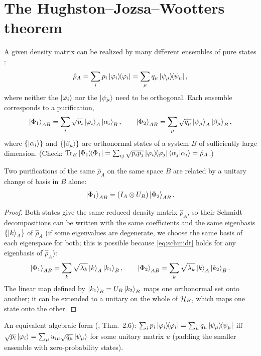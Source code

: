 \section{The Hughston--Jozsa--Wootters theorem}\label{app:hjw}
A given density matrix can be realized by many different ensembles of pure states \cite{HJW1993}:
\begin{equation}
  \hat\rho_A=\sum_ip_i\left|\varphi_i\middle\rangle\!\middle\langle\varphi_i\right|=\sum_\mu q_\mu\left|\psi_\mu\middle\rangle\!\middle\langle\psi_\mu\right|,
\end{equation}
where neither the $\left|\varphi_i\right\rangle$ nor the $\left|\psi_\mu\right\rangle$ need to be orthogonal. Each ensemble corresponds to a purification,
\begin{equation}
  \left|\Phi_1\right\rangle_{AB}=\sum_i\sqrt{p_i}\left|\varphi_i\right\rangle_A\left|\alpha_i\right\rangle_B,\qquad\left|\Phi_2\right\rangle_{AB}=\sum_\mu\sqrt{q_\mu}\left|\psi_\mu\right\rangle_A\left|\beta_\mu\right\rangle_B,
\end{equation}
where $\{\left|\alpha_i\right\rangle\}$ and $\{\left|\beta_\mu\right\rangle\}$ are orthonormal states of a system $B$ of sufficiently large dimension. (Check: $\operatorname{Tr}_B\left|\Phi_1\middle\rangle\!\middle\langle\Phi_1\right|=\sum_{ij}\sqrt{p_ip_j}\left|\varphi_i\middle\rangle\!\middle\langle\varphi_j\right|\left\langle\alpha_j\middle|\alpha_i\right\rangle=\hat\rho_A$.)
\begin{theorem}[HJW]
Two purifications of the same $\hat\rho_A$ on the same space $B$ are related by a unitary change of basis in $B$ alone:
\begin{equation}
  \left|\Phi_1\right\rangle_{AB}=(I_A\otimes U_B)\left|\Phi_2\right\rangle_{AB}.
\end{equation}
\end{theorem}
\begin{proof}
Both states give the same reduced density matrix $\hat\rho_A$, so their Schmidt decompositions can be written with the same coefficients and the same eigenbasis $\{\left|k\right\rangle_A\}$ of $\hat\rho_A$ (if some eigenvalues are degenerate, we choose the same basis
of each eigenspace for both; this is possible because \cref{eq:schmidt} holds for any eigenbasis of $\hat\rho_A$):
\begin{equation}
  \left|\Phi_1\right\rangle_{AB}=\sum_k\sqrt{\lambda_k}\left|k\right\rangle_A\left|k_1\right\rangle_B,\qquad\left|\Phi_2\right\rangle_{AB}=\sum_k\sqrt{\lambda_k}\left|k\right\rangle_A\left|k_2\right\rangle_B .
\end{equation}
The linear map defined by $\left|k_1\right\rangle_B=U_B\left|k_2\right\rangle_B$ maps one orthonormal set onto another; it can be extended to a unitary on the whole of $\mathcal H_B$, which maps one state onto the other.
\end{proof}
An equivalent algebraic form (\cite{NielsenChuang}, Thm.~2.6): $\sum_ip_i\left|\varphi_i\middle\rangle\!\middle\langle\varphi_i\right|=\sum_\mu q_\mu\left|\psi_\mu\middle\rangle\!\middle\langle\psi_\mu\right|$ iff $\sqrt{p_i}\left|\varphi_i\right\rangle=\sum_\mu u_{i\mu}\sqrt{q_\mu}\left|\psi_\mu\right\rangle$ for some unitary matrix $u$ (padding the
smaller ensemble with zero-probability states).


